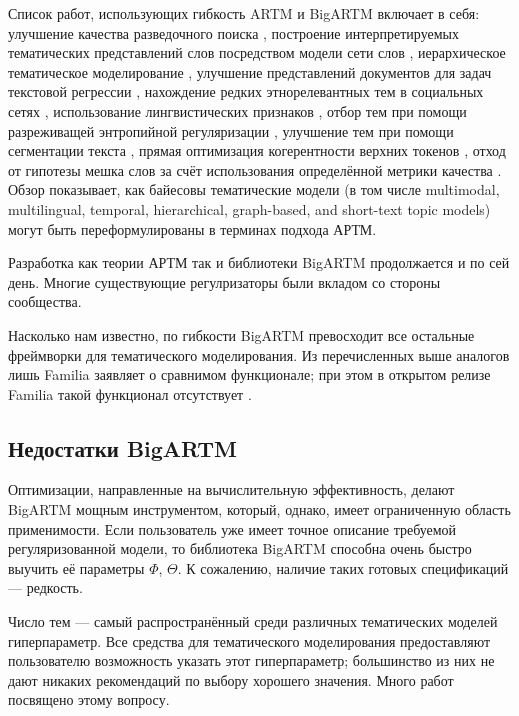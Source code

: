 Список работ, использующих гибкость ARTM и BigARTM включает в себя: улучшение качества разведочного поиска \cite{yanina17technews}, 
построение интерпретируемых тематических представлений слов посредством модели сети слов \cite{potapenko17interpretable}, 
иерархическое тематическое моделирование \cite{chirkova16additive}, 
улучшение представлений документов для задач текстовой регрессии \cite{sokolov15topic}, 
нахождение редких этнорелевантных тем в социальных сетях \cite{apishev16additive,apishev16mining}, 
использование лингвистических признаков \cite{popov_hier}, отбор тем при помощи разреживащей энтропийной регуляризации \cite{voron15slds}, улучшение тем при помощи сегментации текста \cite{skachkov}, 
прямая оптимизация когерентности верхних токенов \cite{4keys}, 
отход от гипотезы мешка слов за счёт использования определённой метрики качества \cite{intracoh}. 
Обзор \cite{kochedykov2017fast} показывает, как байесовы тематические модели (в том числе multimodal, multilingual, temporal, hierarchical, graph-based, and short-text topic models) могут быть переформулированы в терминах подхода АРТМ.

Разработка как теории АРТМ так и библиотеки \mbox{BigARTM} продолжается и по сей день. Многие существующие регулризаторы были вкладом со стороны сообщества.

Насколько нам известно, по гибкости BigARTM превосходит все остальные фреймворки для тематического моделирования. Из перечисленных выше аналогов лишь Familia заявляет о сравнимом функционале; при этом в открытом релизе Familia такой функционал отсутствует \cite{familia_github}.

\subsection{Недостатки BigARTM}

Оптимизации, направленные на вычислительную эффективность, делают BigARTM мощным инструментом, который, однако, имеет ограниченную область применимости. Если пользователь уже имеет точное описание требуемой регуляризованной модели, то библиотека BigARTM способна очень быстро выучить её параметры $\Phi$, $\Theta$. К сожалению, наличие таких готовых спецификаций --- редкость.

Число тем --- самый распространённый среди различных тематических моделей гиперпараметр. Все средства для тематического моделирования предоставляют пользователю возможность указать этот гиперпараметр; большинство из них не дают никаких рекомендаций по выбору хорошего значения. Много работ посвящено этому вопросу.

